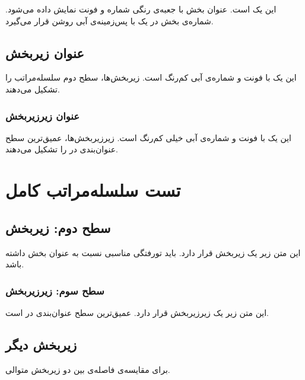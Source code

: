 \documentclass{matinbook}
\begin{document}
این یک  است. عنوان بخش با
جعبه‌ی رنگی شماره و فونت \pnum{۱۵pt} نمایش داده می‌شود.
شماره‌ی بخش در یک  با پس‌زمینه‌ی آبی روشن
قرار می‌گیرد.

\subsection{عنوان زیربخش}
\label{sec:headings-subsection}

این یک  با فونت \pnum{۱۳pt}
و شماره‌ی آبی کم‌رنگ است. زیربخش‌ها، سطح دوم سلسله‌مراتب
را تشکیل می‌دهند.

\subsubsection{عنوان زیرزیربخش}
\label{sec:headings-subsubsection}

این یک  با فونت \pnum{۱۱pt}
و شماره‌ی آبی خیلی کم‌رنگ است. زیرزیربخش‌ها، عمیق‌ترین
سطح عنوان‌بندی در  را تشکیل می‌دهند.

\section{تست سلسله‌مراتب کامل}
\label{sec:headings-hierarchy}

\subsection{سطح دوم: زیربخش}
\label{sec:headings-level2}

این متن زیر یک زیربخش قرار دارد. باید تورفتگی مناسبی
نسبت به عنوان بخش داشته باشد.

\subsubsection{سطح سوم: زیرزیربخش}
\label{sec:headings-level3}

این متن زیر یک زیرزیربخش قرار دارد. عمیق‌ترین سطح
عنوان‌بندی در  است.

\subsection{زیربخش دیگر}
\label{sec:headings-other}

برای مقایسه‌ی فاصله‌ی بین دو زیربخش متوالی.

\end{document}
